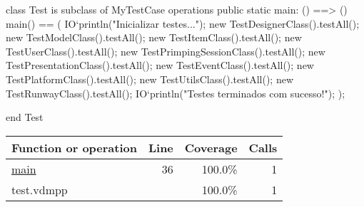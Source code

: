 \begin{vdmpp}[breaklines=true]
class Test is subclass of MyTestCase
operations
public static main: () ==> ()
 main() == (
 IO`println("Inicializar testes...");
  new TestDesignerClass().testAll();
  new TestModelClass().testAll();
  new TestItemClass().testAll();
  new TestUserClass().testAll();
  new TestPrimpingSessionClass().testAll();
  new TestPresentationClass().testAll();
  new TestEventClass().testAll();
  new TestPlatformClass().testAll();
  new TestUtilsClass().testAll();  
  new TestRunwayClass().testAll();
  IO`println("Testes terminados com sucesso!");
 );

end Test
\end{vdmpp}
\bigskip
\begin{longtable}{|l|r|r|r|}
\hline
Function or operation & Line & Coverage & Calls \\
\hline
\hline
\hyperref[main:36]{main} & 36&100.0\% & 1 \\
\hline
\hline
test.vdmpp & & 100.0\% & 1 \\
\hline
\end{longtable}


